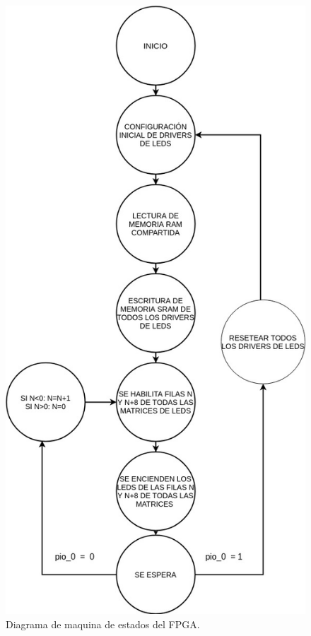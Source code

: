 \begin{figure}[htpb]
	\centering
	\includegraphics[scale=0.6]{Figures/maquinaestados.jpg} 
	\caption{Diagrama de maquina de estados del FPGA.}
	\label{fig: diagrama estados}
\end{figure}







